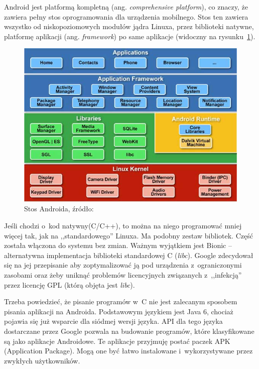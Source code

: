 Android jest platformą kompletną (ang. \emph{comprehensive platform}), co znaczy, że zawiera pełny stos oprogramowania dla urządzenia mobilnego. Stos ten zawiera wszystko od niskopoziomowych modułów jądra Linuxa, przez biblioteki natywne, platformę aplikacji (ang. \emph{framework}) po same aplikacje (widoczny na rysunku~\ref{fig:android_architecture}).

\begin{figure}
	\centering
		\includegraphics[scale=0.7]{img/android_architecture.jpg}
	\caption{Stos Androida, źródło: \cite{android-stack}}
	\label{fig:android_architecture}	
\end{figure}

Jeśli chodzi o~kod natywny(C/C++), to można na niego programować mniej więcej tak, jak na ,,standardowego'' Linuxa\cite{learning-android}. Ma podobny zestaw bibliotek. Część została włączona do systemu bez zmian. Ważnym wyjątkiem jest Bionic -- alternatywna implementacja biblioteki standardowej C (\emph{libc}). Google zdecydował się na jej przepisanie aby zoptymalizować ją pod urządzenia z~ograniczonymi zasobami oraz żeby uniknąć problemów licencyjnych związanych z~,,infekcją'' przez licencję GPL (którą objęta jest \emph{libc}).

Trzeba powiedzieć, że pisanie programów w~C nie jest zalecanym sposobem pisania aplikacji na Androida. Podstawowym językiem jest Java 6, chociaż pojawia się już wsparcie dla siódmej wersji języka\cite{android-java-7}. API dla tego języka dostarczane przez Google pozwala na budowanie programów, które klasyfikowane są jako aplikacje Androidowe\cite{learning-android}. Te aplikacje przyjmuję postać paczek APK (Application Package). Mogą one być łatwo instalowane i~wykorzystywane przez zwykłych użytkowników.

